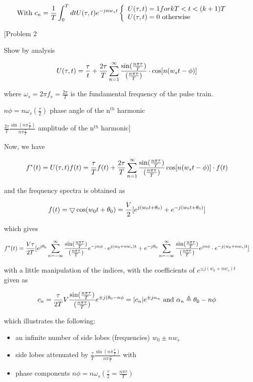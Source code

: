 \documentclass[11pt,fleqn]{book} %
\begin{document}
$$\text{With } c_n={1\over T}\int_0^T dt  U(\tau,t)e^{-jnw_st}\left\{
  \begin{array}{l l}
    U(\tau,t) = 1 for kT < t < (k+1)T & \\
    U(\tau,t) = 0 \text{ otherwise} &
  \end{array}\right.$$

[Problem 2

Show by analysis

$$U(\tau,t) = {\tau\over t} + {2\tau\over T}\sum_{n=1}^\infty{\sin({n\pi\tau\over T})\over({n\pi\tau\over T})}\cdot\cos[n(w_st-\phi)]$$

where $\omega_s=2\pi f_s=\frac{2\pi}{T}$ is the fundamental frequency of the pulse train.

$n\phi=n\omega_s(\frac{\tau}{2})$ phase angle of the n$^{th}$ harmonic

$\frac{2\tau}{T}\frac{\sin(n\pi\frac{\tau}{T})}{n\pi\frac{\tau}{T}}$ amplitude of the n$^{th}$ harmonic]

Now, we have

$$f^*(t)=U(\tau,t) f(t)={\tau\over T}f(t) + {2\tau\over T}\sum_{n=1}^\infty{\sin({n\pi\tau\over T})\over ({n\pi\tau\over T})}\cos[n(w_st-\phi)]\cdot f(t)$$

and the frequency spectra is obtained as

$$f(t)=\bigtriangledown\cos(w_0t+\theta_0)={V\over 2}[e^{j(w_0t+\theta_0)}+e^{-j(w_0t+\theta_0)}]$$

which gives

$$f^*(t)={V\tau\over 2T}[e^{j\theta_0}\sum_{n=-\infty}^\infty{\sin({n\pi\tau\over T})\over({n\pi\tau\over T})}e^{-jn\phi}\cdot e^{j(w_0+nw_s)t}+e^{-j\theta_0}\sum_{n=-\infty}^\infty{\sin({n\pi\tau\over T})\over({n\pi\tau\over T})}e^{jn\phi}\cdot e^{-j(w_0+nw_s)t}]$$

with a little manipulation of the indices, with the coefficients of $e^{\pm j(w_0+nw_s)t}$ given as

$$c_n={\tau\over 2T}V{\sin({n\pi\tau\over T})\over ({n\pi\tau\over T})} e^{\pm j(\theta_0-n\phi}=|c_n|e^{\pm j\alpha_n}\text{ and } \alpha_n\triangleq\theta_0-n\phi$$

which illustrates the following:

\begin{itemize}
 \item an infinite number of side lobes (frequencies) $w_0\pm nw_s$
 \item side lobes attenuated by $\frac{\tau}{T}\frac{\sin(n\pi\frac{\tau}{T})}{n\pi\frac{\tau}{T}}$ with
 \item phase components $n\phi=n\omega_s(\frac{\tau}{2}=\frac{n\pi\tau}{T})$
\end{itemize}
\end{document}
